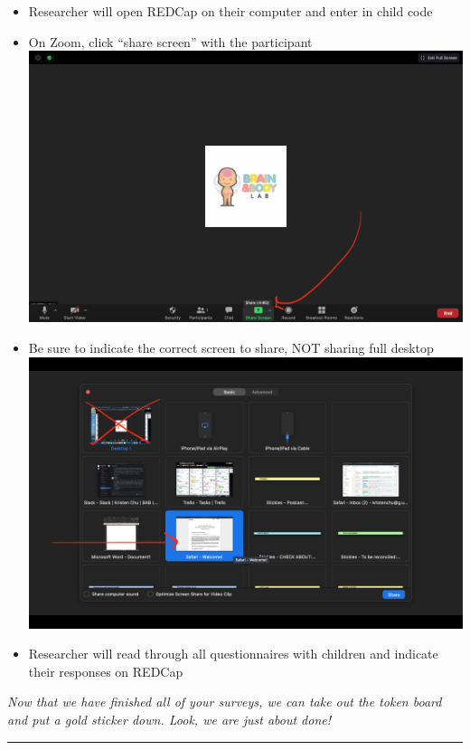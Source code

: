 \documentclass[]{book}
\providecommand{\tightlist}{%
  \setlength{\itemsep}{0pt}\setlength{\parskip}{0pt}}
\begin{document}
\begin{itemize}
\tightlist
\item
  Researcher will open REDCap on their computer and enter in child code
\item
  On Zoom, click ``share screen'' with the participant \includegraphics{images/zoom_screenshare/1.png}
\item
  Be sure to indicate the correct screen to share, NOT sharing full desktop \includegraphics{images/zoom_screenshare/2.png}
\item
  Researcher will read through all questionnaires with children and indicate their responses on REDCap
\end{itemize}

\emph{Now that we have finished all of your surveys, we can take out the token board and put a gold sticker down. Look, we are just about done!}

\begin{center}\rule{0.5\linewidth}{0.5pt}\end{center}
\end{document}
